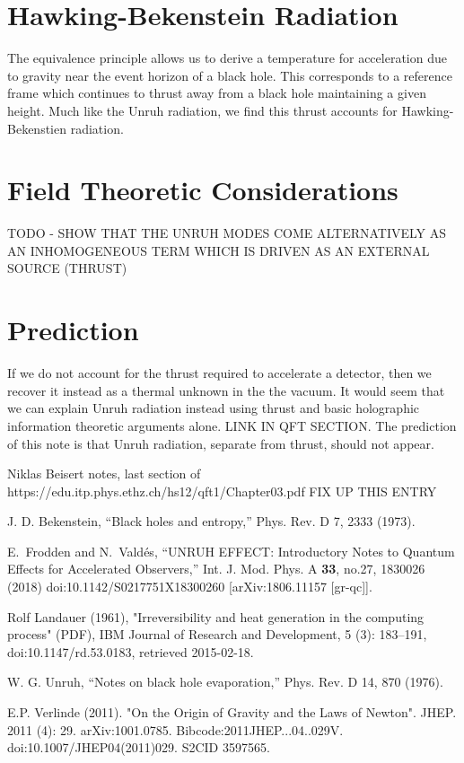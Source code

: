\documentclass[12pt,a4paper]{article}
\begin{document}
\section{Hawking-Bekenstein Radiation}

The equivalence principle allows us to derive a temperature for acceleration due to gravity near the event horizon of a black hole.  This corresponds to a reference frame which continues to thrust away from a black hole maintaining a given height.  Much like the Unruh radiation, we find this thrust accounts for Hawking-Bekenstien radiation.

\section{Field Theoretic Considerations}
TODO - SHOW THAT THE UNRUH MODES COME ALTERNATIVELY AS AN INHOMOGENEOUS TERM WHICH IS DRIVEN AS AN EXTERNAL SOURCE (THRUST)
\cite{beisert}

\section{Prediction}
If we do not account for the thrust required to accelerate a detector, then we recover it instead as a thermal unknown in the the vacuum.  It would seem that we can explain Unruh radiation instead using thrust and basic holographic information theoretic arguments alone.  LINK IN QFT SECTION. The prediction of this note is that Unruh radiation, separate from thrust, should not appear.

\begin{thebibliography}{2}

Niklas Beisert notes, last section of 
https://edu.itp.phys.ethz.ch/hs12/qft1/Chapter03.pdf
FIX UP THIS ENTRY

 J. D. Bekenstein, “Black holes and entropy,” Phys. Rev. D 7, 2333 (1973).

E.~Frodden and N.~Vald\'es,
``UNRUH EFFECT: Introductory Notes to Quantum Effects for Accelerated Observers,''
Int. J. Mod. Phys. A \textbf{33}, no.27, 1830026 (2018)
doi:10.1142/S0217751X18300260
[arXiv:1806.11157 [gr-qc]].
  
Rolf Landauer (1961), "Irreversibility and heat generation in the computing process" (PDF), IBM Journal of Research and Development, 5 (3): 183–191, doi:10.1147/rd.53.0183, retrieved 2015-02-18.

W. G. Unruh, “Notes on black hole evaporation,” Phys. Rev. D 14, 870 (1976).

E.P. Verlinde (2011). "On the Origin of Gravity and the Laws of Newton". JHEP. 2011 (4): 29. arXiv:1001.0785. Bibcode:2011JHEP...04..029V. doi:10.1007/JHEP04(2011)029. S2CID 3597565.
\end{thebibliography}
\end{document}
